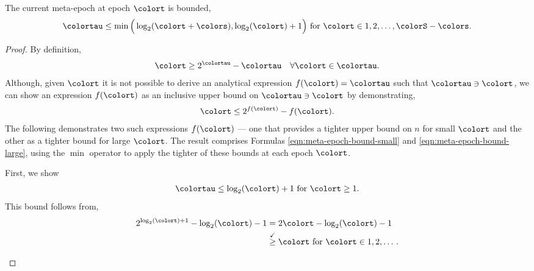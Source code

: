 \begin{lemma}
\label{thm:meta-epoch-bound}
The current meta-epoch at epoch $\colort$ is bounded,
\begin{align*}
\colortau \leq
\min\Big(
  \log_2(\colort + \colors),
  \log_2(\colort) + 1
\Big)
\text{ for } \colort \in 1, 2, \ldots, \colorS - \colors.
\end{align*}
\end{lemma}
\begin{proof}

By definition,
\begin{align*}
\colort \geq 2^{\colortau} - \colortau \quad \forall \colort \in \colortau.
\end{align*}
Although, given $\colort$ it is not possible to derive an analytical expression $f(\colort) = \colortau$ such that $\colortau \ni \colort$, we can show an expression $f(\colort)$ as an inclusive upper bound on $\colortau \ni \colort$ by demonstrating,
\begin{align*}
\colort \leq 2^{f(\colort)} - f(\colort).
\end{align*}
The following demonstrates two such expressions $f(\colort)$ --- one that provides a tighter upper bound on $n$ for small $\colort$ and the other as a tighter bound for large $\colort$.
The result comprises Formulas \ref{eqn:meta-epoch-bound-small} and \ref{eqn:meta-epoch-bound-large}, using the $\min$ operator to apply the tighter of these bounds at each epoch $\colort$.

\begin{proofpart}
First, we show
\begin{align}
\colortau \leq \log_2(\colort) + 1 \text{ for } \colort \geq 1.
\label{eqn:meta-epoch-bound-small}
\end{align}
This bound follows from,
\begin{align*}
2^{\log_{2}(\colort) + 1} - \log_2(\colort) - 1
&= 2\colort - \log_2(\colort) - 1 \\
&\stackrel{\checkmark}{\geq} \colort \text{ for } \colort \in 1, 2, \ldots \, .
\end{align*}
\end{proofpart}


\end{proof}
